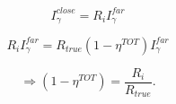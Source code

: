 \begin{equation}
 I_{\gamma}^{close} = R_{i} I_{\gamma}^{far}
\end{equation}

\begin{equation}
R_{i} I_{\gamma}^{far} = R_{true} (1-\eta^{TOT}) I_{\gamma}^{far}
\end{equation}

\begin{equation}
\Rightarrow (1-\eta^{TOT}) = \dfrac{R_{i}}{R_{true}}.
\end{equation}









